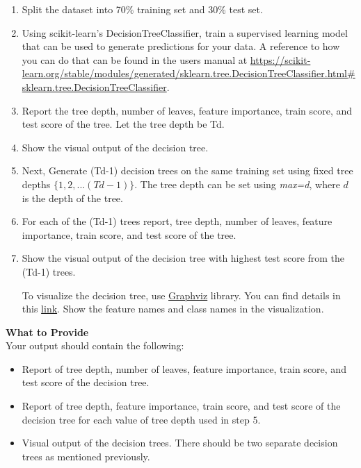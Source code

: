 \documentclass[letter-paper,12pt]{article} %
\begin{document}
\begin{enumerate}
    \item Split the dataset into 70\% training set and 30\% test set.

    \item Using scikit-learn’s DecisionTreeClassifier, train a supervised learning model that can be used to generate predictions for your data. A reference to how you can do that can be found in the users manual at \url{https://scikit-learn.org/stable/modules/generated/sklearn.tree.DecisionTreeClassifier.html#sklearn.tree.DecisionTreeClassifier}.
    
    \item Report the tree depth, number of leaves, feature importance, train score, and test score of the tree.  Let the tree depth be Td. 
    
    \item Show the visual output of the decision tree. 
    
    \item   Next, Generate (Td-1) decision trees on the same training set using fixed tree depths $\{1, 2, ... (Td-1)\}$. The tree depth can be set using \textit{max\depth=d}, where $d$ is the depth of the tree.
    
    \item For each of the (Td-1) trees report, tree depth, number of leaves, feature importance, train score, and test score of the tree. 
    
    \item Show the visual output of the decision tree with highest test score from the (Td-1) trees.
    
    To visualize the decision tree, use \href{https://scikit-learn.org/stable/modules/tree.html#tree-algorithms-id3-c4-5-c5-0-and-cart}{Graphviz} library. You can find details in this \href{https://scikit-learn.org/stable/modules/tree.html#tree-algorithms-id3-c4-5-c5-0-and-cart}{link}. Show the feature names and class names in the visualization.\\
\end{enumerate}

\textbf{What to Provide}\\
Your output should contain the following:
\begin{itemize}
    \item Report of tree depth, number of leaves, feature importance, train score, and test score of the decision tree. 
    
    \item Report of tree depth, feature importance, train score, and test score of the decision tree for each  value of tree depth used in step 5. 
    
    \item Visual output of the decision trees. There should be two separate decision trees as mentioned previously. 
\end{itemize}
\end{document}

